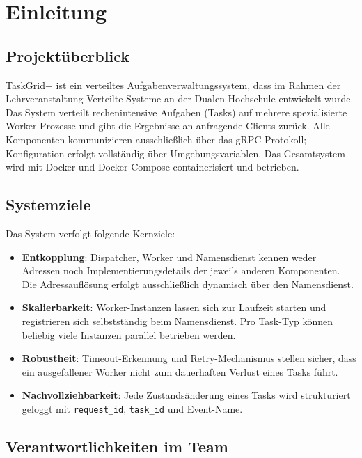 \section{Einleitung}

\subsection{Projektüberblick}

TaskGrid+ ist ein verteiltes Aufgabenverwaltungssystem, dass im Rahmen der Lehrveranstaltung Verteilte Systeme an der Dualen Hochschule entwickelt wurde.
Das System verteilt rechenintensive Aufgaben (Tasks) auf mehrere spezialisierte Worker-Prozesse
und gibt die Ergebnisse an anfragende Clients zurück.
Alle Komponenten kommunizieren ausschließlich über das gRPC-Protokoll;
Konfiguration erfolgt vollständig über Umgebungsvariablen.
Das Gesamtsystem wird mit Docker und Docker Compose containerisiert und betrieben.

\subsection{Systemziele}

Das System verfolgt folgende Kernziele:

\begin{itemize}
  \item \textbf{Entkopplung}: Dispatcher, Worker und Namensdienst kennen weder
        Adressen noch Implementierungsdetails der jeweils anderen Komponenten.
        Die Adressauflösung erfolgt ausschließlich dynamisch über den Namensdienst.
  \item \textbf{Skalierbarkeit}: Worker-Instanzen lassen sich zur Laufzeit
        starten und registrieren sich selbstständig beim Namensdienst.
        Pro Task-Typ können beliebig viele Instanzen parallel betrieben werden.
  \item \textbf{Robustheit}: Timeout-Erkennung und Retry-Mechanismus stellen sicher,
        dass ein ausgefallener Worker nicht zum dauerhaften Verlust eines Tasks führt.
  \item \textbf{Nachvollziehbarkeit}: Jede Zustandsänderung eines Tasks wird
        strukturiert geloggt mit \texttt{request\_id}, \texttt{task\_id} und Event-Name.
\end{itemize}

\subsection{Verantwortlichkeiten im Team}

